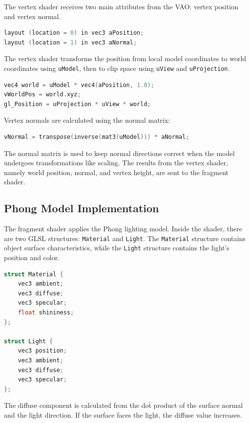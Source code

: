 \documentclass[12pt,a4paper]{article}
\begin{document}
The vertex shader receives two main attributes from the VAO: vertex position and vertex normal.

\begin{lstlisting}[language=C++]
layout (location = 0) in vec3 aPosition;
layout (location = 1) in vec3 aNormal;
\end{lstlisting}

The vertex shader transforms the position from local model coordinates to world
coordinates using \texttt{uModel}, then to clip space using \texttt{uView} and \texttt{uProjection}.

\begin{lstlisting}[language=C++]
vec4 world = uModel * vec4(aPosition, 1.0);
vWorldPos = world.xyz;
gl_Position = uProjection * uView * world;
\end{lstlisting}

Vertex normals are calculated using the normal matrix:

\begin{lstlisting}[language=C++]
vNormal = transpose(inverse(mat3(uModel))) * aNormal;
\end{lstlisting}

The normal matrix is used to keep normal directions correct when the model
undergoes transformations like scaling. The results from the vertex shader,
namely world position, normal, and vertex height, are sent to the fragment shader.

\subsection{Phong Model Implementation}

The fragment shader applies the Phong lighting model. Inside the shader, there
are two GLSL structures: \texttt{Material} and \texttt{Light}. The \texttt{Material}
structure contains object surface characteristics, while the \texttt{Light}
structure contains the light's position and color.

\begin{lstlisting}[language=C++]
struct Material {
    vec3 ambient;
    vec3 diffuse;
    vec3 specular;
    float shininess;
};

struct Light {
    vec3 position;
    vec3 ambient;
    vec3 diffuse;
    vec3 specular;
};
\end{lstlisting}

The diffuse component is calculated from the dot product of the surface normal
and the light direction. If the surface faces the light, the diffuse value increases.
\end{document}
